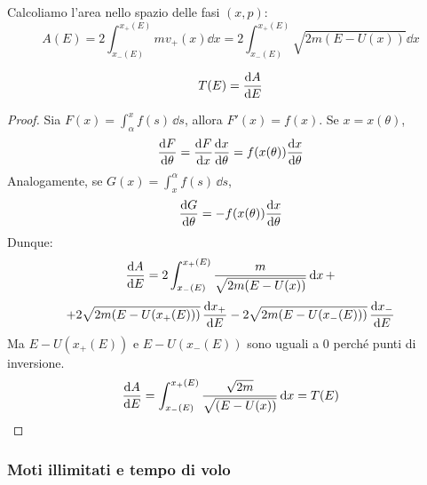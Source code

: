 Calcoliamo l'area nello spazio delle fasi $(x, p)$:
\begin{equation}
    A(E )= 2\int_{x_-(E)}^{x_+(E )}m v_+(x)\dd{x}= 2\int_{x_-(E)}^{x_+(E )} \sqrt{2m\left( E-U(x) \right)}\dd{x}
\end{equation}
\begin{proposition}
    \begin{equation}
        T(E )= \dv{A}{E}(E )    
    \end{equation}
\end{proposition}
\begin{proof}
    Sia $F(x) = \int_{\alpha}^{x} f(s)\,\dd{s}$, allora $F'(x) = f(x)$. Se $x = x(\theta)$,
    \begin{equation*}
        \dv{F}{\theta} = \dv{F}{x} \dv{x}{\theta} = f(x(\theta)) \dv{x}{\theta}
    \end{equation*}
    Analogamente, se $G(x) = \int_{x}^{\alpha} f(s)\,\dd{s}$,
    \begin{equation*}
        \dv{G}{\theta} = -f(x(\theta)) \dv{x}{\theta}
    \end{equation*}
    Dunque:
    \begin{equation*}
        \dv{A}{E} = 
        2 \int_{x_-(E)}^{x_+(E)} \frac{ m}{\sqrt{2m(E - U(x))}} \dd{x} + 
    \end{equation*}
    \begin{equation*}
        + 2 \sqrt{2m(E - U(x_+(E)))} \, \dv{x_+}{E}
        - 2 \sqrt{2m(E - U(x_-(E)))} \, \dv{x_-}{E}
    \end{equation*}
    Ma $E - U(x_+(E))$ e $E - U(x_-(E))$ sono uguali a $0$ perché punti di inversione.
    \begin{equation*}
        \dv{A}{E} = 
         \int_{x_-(E)}^{x_+(E)} \frac{ \sqrt{2m}}{\sqrt{(E - U(x))}} \dd{x}= T(E)
    \end{equation*}
\end{proof}


\subsubsection{Moti illimitati e tempo di volo}

